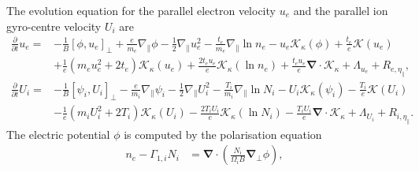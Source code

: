 \documentclass{hitec} %
\renewcommand{\vec}[1]{\boldsymbol{#1}}
\begin{document}
The evolution equation for the parallel electron velocity \(u_e\) and the parallel ion gyro-centre velocity \(U_i\) are
\begin{align}
\frac{\partial}{\partial t}  u_e
      =&
      - \frac{1 }{ B} \left[ \phi, u_e  \right]_{\perp}
      +  \frac{e}{m_e}   \nabla_\parallel \phi
      -   \frac{1}{2}   \nabla_\parallel u_e^2
      - \frac{t_e}{m_e } \nabla_\parallel \ln  n_e
     - u_e   \mathcal{K}_{\kappa} \left( \phi  \right)
     + \frac{t_e}{e} \mathcal{K}\left(  u_e \right)
     \nonumber  \\    &
     + \frac{1}{e} \left(m_e  u_e^2 +  2  t_e\right)\mathcal{K}_{\kappa} \left(u_e\right)
    + \frac{2  t_e u_e }{ e} \mathcal{K}_{\kappa} \left(\ln n_e \right)
    + \frac{t_e  u_e }{e} \vec{\nabla} \cdot  \vec{\mathcal{K}}_{\kappa}
    +\Lambda_{u_e} + R_{e, \eta_\parallel},  \\
\frac{\partial}{\partial t}    U_i
      =&
      - \frac{1 }{ B} \left[ \psi_i, U_i  \right]_{\perp}
      -  \frac{e}{m_i}   \nabla_\parallel \psi_i
      -     \frac{1}{2}  \nabla_\parallel U_i^2
      - \frac{T_i}{m_i } \nabla_\parallel \ln  N_i
     -  U_i  \mathcal{K}_{\kappa} \left( \psi_i  \right)
     - \frac{T_i}{e} \mathcal{K}\left(  U_i \right)
     \nonumber  \\    &
           - \frac{1}{e}\left(m_i  U_i^2 + 2  T_i \right) \mathcal{K}_{\kappa} \left(U_i\right)
           - \frac{2  T_i U_i }{ e} \mathcal{K}_{\kappa} \left(\ln N_i \right)
           - \frac{T_i  U_i }{e} \vec{\nabla} \cdot  \vec{\mathcal{K}}_{\kappa}
           +\Lambda_{U_i} + R_{i,\eta_\parallel} .
\end{align}
The electric potential \(\phi\) is computed by the polarisation equation
\begin{align}
  n_e -\Gamma_{1,i} N_i &= \vec{\nabla} \cdot\left(\frac{N_i}{\Omega_i B} \vec{\nabla}_\perp \phi\right),
\end{align}
\end{document}
